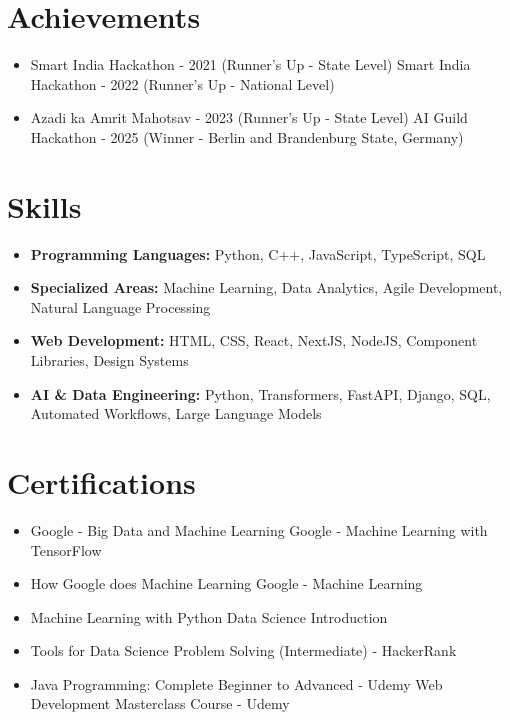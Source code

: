 \documentclass[a4paper,10pt]{article}
\begin{document}
\section*{Achievements}
\begin{itemize}
\item Smart India Hackathon - 2021 (Runner's Up - State Level) \hfill Smart India Hackathon - 2022 (Runner's Up - National Level)
\item Azadi ka Amrit Mahotsav - 2023 (Runner's Up - State Level) \hfill AI Guild Hackathon - 2025 (Winner - Berlin and Brandenburg State, Germany)
\end{itemize}

\section*{Skills}
\begin{itemize}
  \item \textbf{Programming Languages:} Python, C++, JavaScript, TypeScript, SQL
  \item \textbf{Specialized Areas:} Machine Learning, Data Analytics, Agile Development, Natural Language Processing
  \item \textbf{Web Development:} HTML, CSS, React, NextJS, NodeJS, Component Libraries, Design Systems
  \item \textbf{AI \& Data Engineering:} Python, Transformers, FastAPI, Django, SQL, Automated Workflows, Large Language Models
\end{itemize}

\section*{Certifications}
\begin{itemize}
\item Google - Big Data and Machine Learning \hfill Google - Machine Learning with TensorFlow
\item How Google does Machine Learning \hfill Google - Machine Learning
\item Machine Learning with Python \hfill Data Science Introduction
\item Tools for Data Science \hfill Problem Solving (Intermediate) - HackerRank
\item Java Programming: Complete Beginner to Advanced - Udemy \hfill Web Development Masterclass Course - Udemy
\end{itemize}
\end{document}
